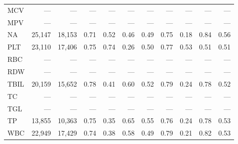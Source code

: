 \begin{table}[ht]
\begin{tabular}{lrrrrrrrrrr}
MCV & --- & --- & --- & --- & --- & --- & --- & --- & --- & --- \\
MPV & --- & --- & --- & --- & --- & --- & --- & --- & --- & --- \\
NA & 25,147 & 18,153 & 0.71 & 0.52 & 0.46 & 0.49 & 0.75 & 0.18 & 0.84 & 0.56 \\
PLT & 23,110 & 17,406 & 0.75 & 0.74 & 0.26 & 0.50 & 0.77 & 0.53 & 0.51 & 0.51 \\
RBC & --- & --- & --- & --- & --- & --- & --- & --- & --- & --- \\
RDW & --- & --- & --- & --- & --- & --- & --- & --- & --- & --- \\
TBIL & 20,159 & 15,652 & 0.78 & 0.41 & 0.60 & 0.52 & 0.79 & 0.24 & 0.78 & 0.52 \\
TC & --- & --- & --- & --- & --- & --- & --- & --- & --- & --- \\
TGL & --- & --- & --- & --- & --- & --- & --- & --- & --- & --- \\
TP & 13,855 & 10,363 & 0.75 & 0.35 & 0.65 & 0.55 & 0.76 & 0.24 & 0.78 & 0.53 \\
WBC & 22,949 & 17,429 & 0.74 & 0.38 & 0.58 & 0.49 & 0.79 & 0.21 & 0.82 & 0.53 \\
\bottomrule
\end{tabular}
\label{tab:12_eval_detail_inspire_prolonged_los}
\end{table}
